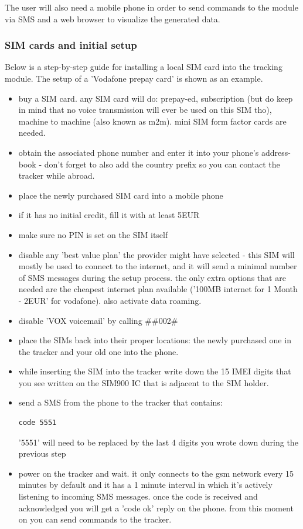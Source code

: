 \documentclass[a4paper,twoside]{refart}
\begin{document}
The user will also need a mobile phone in order to send commands to the module via SMS and a web browser to visualize the generated data.

\subsubsection{SIM cards and initial setup}

Below is a step-by-step guide for installing a local SIM card into the tracking module. The setup of a 'Vodafone prepay card' is shown as an example.

\begin{itemize}
    \item buy a SIM card. any SIM card will do: prepay-ed, subscription (but do keep in mind that no voice transmission will ever be used on this SIM tho), machine to machine (also known as \gls{m2m}). mini SIM form factor cards are needed.
    \item obtain the associated phone number and enter it into your phone's address-book - don't forget to also add the country prefix so you can contact the tracker while abroad.
    \item place the newly purchased SIM card into a mobile phone
    \item if it has no initial credit, fill it with at least 5EUR
    \item make sure no PIN is set on the SIM itself
    \item disable any 'best value plan' the provider might have selected - this SIM will mostly be used to connect to the internet, and it will send a minimal number of SMS messages during the setup process. the only extra options that are needed are the cheapest internet plan available ('100MB internet for 1 Month - 2EUR' for vodafone). also activate data roaming.
    \item disable 'VOX voicemail' by calling \#\#002\#
    \item place the SIMs back into their proper locations: the newly purchased one in the tracker and your old one into the phone.
    \item while inserting the SIM into the tracker write down the 15 IMEI digits that you see written on the SIM900 IC that is adjacent to the SIM holder.
    \item send a SMS from the phone to the tracker that contains:

\begin{lstlisting}
code 5551
\end{lstlisting}

'5551' will need to be replaced by the last 4 digits you wrote down during the previous step

    \item power on the tracker and wait. it only connects to the gsm network every 15 minutes by default and it has a 1 minute interval in which it's actively listening to incoming SMS messages. once the code is received and acknowledged you will get a 'code ok' reply on the phone. from this moment on you can send commands to the tracker.
\end{itemize}
\end{document}

